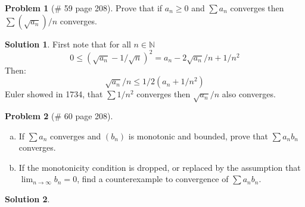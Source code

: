 \documentclass{article}
\theoremstyle{definition}
\newtheorem*{soln}{Solution}
\newtheorem*{prob}{Problem}
\theoremstyle{theorem}
\newcommand{\N}{\mathbb{N}}
\begin{document}
\begin{prob}[\# 59  page 208]
    Prove that if $a_n\geq 0$ and $\sum a_n$ converges then $\sum(\sqrt{a_n})/n$ converges.
\end{prob}
\begin{soln}
   First note that for all $n\in \N$
    $$0\leq (\sqrt{a_n}-1/\sqrt n)^2 = a_n - 2\sqrt{a_n}/n + 1/n^2$$
    Then:
    $$\sqrt{a_n}/n\leq 1/2(a_n +1/n^2)$$
    Euler showed in 1734, that $\sum 1/n^2$ converges then $\sqrt{a_n}/n$ also converges.
\end{soln}
\vspace{1in}

\begin{prob}[\# 60  page 208]
    \begin{enumerate}[(a)]
        \item If $\sum a_n$ converges and $(b_n)$ is monotonic and bounded, prove that $\sum a_nb_n$ converges.
        \item If the monotonicity condition is dropped, or replaced by the assumption that $\lim_{n\to \infty }b_n =0$, find a counterexample to convergence of $\sum a_n b_n$.
    \end{enumerate}
\end{prob}
\begin{soln}
\end{soln}
\vspace{1in}
\end{document}
